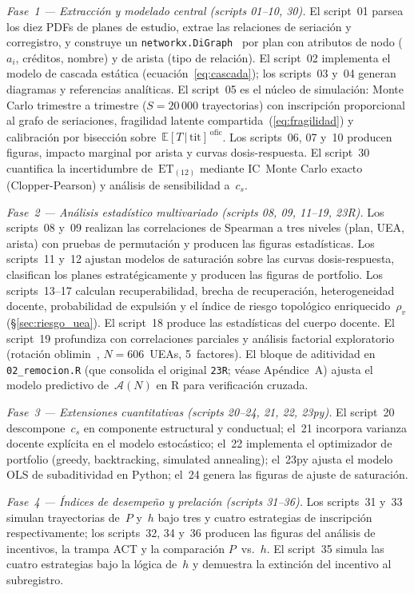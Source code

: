 \documentclass[11pt,letterpaper]{article}
\newcommand{\ET}[1]{\mathrm{ET}_{(#1)}}
\newcommand{\ETtit}{\mathbb{E}[T\,|\,\mathrm{tit}]}
\begin{document}
\textit{Fase~1 --- Extracción y modelado central (scripts 01--10, 30).}
El script~01 parsea los diez PDFs de planes de estudio, extrae las
relaciones de seriación y corregistro, y construye un
\texttt{networkx.DiGraph}~\cite{Hagberg2008} por plan con atributos de
nodo ($a_i$, créditos, nombre) y de arista (tipo de relación).
El script~02 implementa el modelo de cascada estática
(ecuación~\ref{eq:cascada}); los scripts~03 y~04 generan diagramas y
referencias analíticas.
El script~05 es el núcleo de simulación: Monte Carlo trimestre a trimestre
($S=20\,000$ trayectorias) con inscripción proporcional al grafo de
seriaciones, fragilidad latente compartida~(\ref{eq:fragilidad}) y
calibración por bisección sobre~$\ETtit^{\,\mathrm{ofic}}$.
Los scripts~06, 07 y~10 producen figuras, impacto marginal por arista
y curvas dosis-respuesta.
El script~30 cuantifica la incertidumbre de~$\ET{12}$ mediante IC~Monte
Carlo exacto (Clopper-Pearson) y análisis de sensibilidad a~$c_s$.

\textit{Fase~2 --- Análisis estadístico multivariado (scripts 08, 09, 11--19, 23R).}
Los scripts~08 y~09 realizan las correlaciones de Spearman a tres niveles
(plan, UEA, arista) con pruebas de permutación y producen las figuras
estadísticas.
Los scripts~11 y~12 ajustan modelos de saturación sobre las curvas
dosis-respuesta, clasifican los planes estratégicamente y producen las
figuras de portfolio.
Los scripts~13--17 calculan recuperabilidad, brecha de recuperación,
heterogeneidad docente, probabilidad de expulsión y el índice de riesgo
topológico enriquecido~$\rho_v$ (\S\ref{sec:riesgo_uea}).
El script~18 produce las estadísticas del cuerpo docente.
El script~19 profundiza con correlaciones parciales y análisis factorial
exploratorio (rotación oblimin~\cite{Horn1965}, $N=606$~UEAs, 5~factores).
El bloque de aditividad en \texttt{02\_remocion.R} (que consolida el original
\texttt{23R}; véase Apéndice~A) ajusta el modelo predictivo de~$\mathcal{A}(N)$
en R para verificación cruzada.

\textit{Fase~3 --- Extensiones cuantitativas (scripts 20--24, 21, 22, 23py).}
El script~20 descompone~$c_s$ en componente estructural y conductual;
el~21 incorpora varianza docente explícita en el modelo estocástico;
el~22 implementa el optimizador de portfolio (greedy, backtracking,
simulated annealing); el~23py ajusta el modelo OLS de subaditividad
en Python; el~24 genera las figuras de ajuste de saturación.

\textit{Fase~4 --- Índices de desempeño y prelación (scripts 31--36).}
Los scripts~31 y~33 simulan trayectorias de~$P$ y~$h$ bajo tres y cuatro
estrategias de inscripción respectivamente; los scripts~32, 34 y~36
producen las figuras del análisis de incentivos, la trampa ACT y la
comparación $P$~vs.~$h$.
El script~35 simula las cuatro estrategias bajo la lógica de~$h$ y
demuestra la extinción del incentivo al subregistro.
\end{document}

